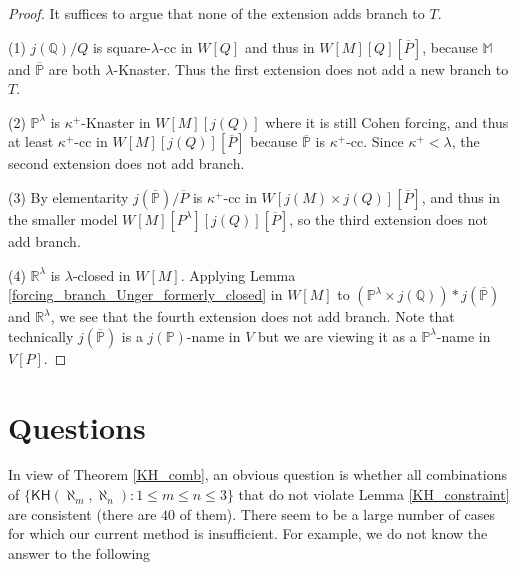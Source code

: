 \documentclass[10pt,reqno]{amsart}
\theoremstyle{plain}
\theoremstyle{definition}
\theoremstyle{remark}
\begin{document}
\begin{proof}
It suffices to argue that none of the extension adds branch to $T$.

(1) $j(\mathbb{Q})/Q$ is square-$\lambda$-cc in $W[Q]$ and thus in $W[M][Q][\overline{P}]$, because $\mathbb{M}$ and $\overline{\mathbb{P}}$ are both $\lambda$-Knaster. Thus the first extension does not add a new branch to $T$.

(2) $\mathbb{P}^\lambda$ is $\kappa^+$-Knaster in $W[M][j(Q)]$ where it is still Cohen forcing, and thus at least $\kappa^+$-cc in $W[M][j(Q)][\overline{P}]$ because $\mathbb{\overline{P}}$ is $\kappa^+$-cc. Since $\kappa^+<\lambda$, the second extension does not add branch.

(3) By elementarity $j(\mathbb{\overline{P}})/\overline{P}$ is $\kappa^+$-cc in $W[j(M)\times j(Q)][\overline{P}]$, and thus in the smaller model $W[M][P^\lambda][j(Q)][\overline{P}]$, so the third extension does not add branch.

(4) $\mathbb{R}^\lambda$ is $\lambda$-closed in $W[M]$. Applying Lemma \ref{forcing_branch_Unger_formerly_closed} in $W[M]$ to $(\mathbb{P}^\lambda\times j(\mathbb{Q})) *j(\mathbb{\overline{P}})$ and $\mathbb{R}^\lambda$, we see that the fourth extension does not add branch. Note that technically $j(\mathbb{\overline{P}})$ is a $j(\mathbb{P})$-name in $V$ but we are viewing it as a $\mathbb{P}^\lambda$-name in $V[P]$.
\end{proof}







\section{Questions}

In view of Theorem \ref{KH_comb}, an obvious question is whether all combinations of $\{\mathsf{KH}(\aleph_m,\aleph_n):1\leq m\leq n\le 3\}$ that do not violate Lemma \ref{KH_constraint} are consistent (there are $40$ of them). There seem to be a large number of cases for which our current method is insufficient. For example, we do not know the answer to the following
\end{document}
